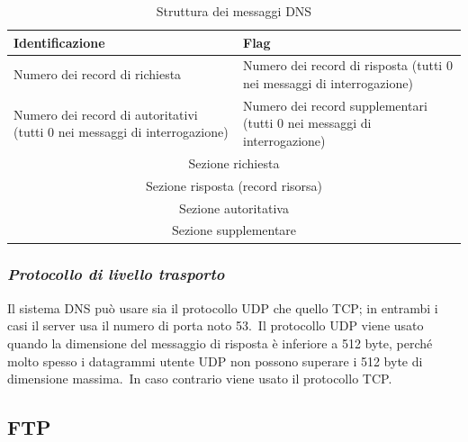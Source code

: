 \begin{table}[H]
    \centering
    \begin{tabular}{|m{15em}|m{15em}|}
        \hline
        Identificazione                                                            & Flag                                                                     \\
        \hline
        Numero dei record di richiesta                                             & Numero dei record di risposta (tutti 0 nei messaggi di interrogazione)   \\
        \hline
        Numero dei record di autoritativi (tutti 0 nei messaggi di interrogazione) & Numero dei record supplementari (tutti 0 nei messaggi di interrogazione) \\
        \hline
        \multicolumn{2}{|c|}{Sezione richiesta}                                                                                                               \\
        \hline
        \multicolumn{2}{|c|}{Sezione risposta (record risorsa)}                                                                                               \\
        \hline
        \multicolumn{2}{|c|}{Sezione autoritativa}                                                                                                            \\
        \hline
        \multicolumn{2}{|c|}{Sezione supplementare}                                                                                                           \\
        \hline
    \end{tabular}
    \caption*{Struttura dei messaggi DNS}
\end{table}

\subsubsection{\emph{Protocollo di livello trasporto}}

Il sistema DNS può usare sia il protocollo UDP che quello TCP; in entrambi i casi il server usa il numero di porta noto 53.\
Il protocollo UDP viene usato quando la dimensione del messaggio di risposta è inferiore a 512 byte, perché molto spesso i datagrammi utente UDP non possono superare i 512 byte di dimensione massima.\
In caso contrario viene usato il protocollo TCP.

\subsection{FTP}

